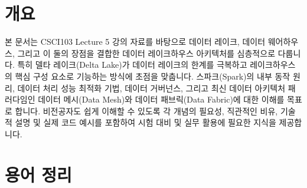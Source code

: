\documentclass[11pt,a4paper]{article}
\begin{document}
\newpage
\section*{개요}
본 문서는 CSCI103 Lecture 5 강의 자료를 바탕으로 데이터 레이크, 데이터 웨어하우스, 그리고 이 둘의 장점을 결합한 데이터 레이크하우스 아키텍처를 심층적으로 다룹니다. 특히 델타 레이크(Delta Lake)가 데이터 레이크의 한계를 극복하고 레이크하우스의 핵심 구성 요소로 기능하는 방식에 초점을 맞춥니다. 스파크(Spark)의 내부 동작 원리, 데이터 처리 성능 최적화 기법, 데이터 거버넌스, 그리고 최신 데이터 아키텍처 패러다임인 데이터 메시(Data Mesh)와 데이터 패브릭(Data Fabric)에 대한 이해를 목표로 합니다. 비전공자도 쉽게 이해할 수 있도록 각 개념의 필요성, 직관적인 비유, 기술적 설명 및 실제 코드 예시를 포함하여 시험 대비 및 실무 활용에 필요한 지식을 제공합니다.

\newpage
\section*{용어 정리}
\end{document}
